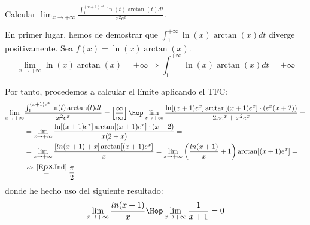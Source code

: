 \begin{ejercicio}
    Calcular $\displaystyle \lim_{x\to +\infty} \frac{\int_1^{(x+1)e^x}\ln (t) \arctan (t) dt}{x^2e^x}$.

    En primer lugar, hemos de demostrar que $\int_1^{+\infty}\ln (x) \arctan (x) dt$ diverge positivamente. Sea $f(x)=\ln (x) \arctan (x)$.
    \begin{equation*}
        \lim_{x\to +\infty} \ln (x) \arctan (x) = +\infty \Longrightarrow \int_1^{+\infty}\ln (x) \arctan (x) dt = +\infty
    \end{equation*}
    
    
    Por tanto, procedemos a calcular el límite aplicando el TFC:
     \begin{equation*}
         \begin{split}
             \lim_{x\to +\infty}& \frac{\int_1^{(x+1)e^x}\ln (t) \arctan (t) dt}{x^2e^x} =\left[\frac{\infty}{\infty}\right]
             \Hop \lim_{x\to +\infty} \frac{\ln[(x+1)e^x] \arctan [(x+1)e^x] \cdot (e^x(x+2))}{2xe^x +x^2e^x} =
             \\&= \lim_{x\to +\infty} \frac{\ln[(x+1)e^x] \arctan [(x+1)e^x] \cdot (x+2)}{x(2+x)} =
             \\&= \lim_{x\to +\infty} \frac{[ln(x+1) +x] \arctan [(x+1)e^x]}{x}
             = \lim_{x\to +\infty} \left(\frac{ln(x+1)}{x} +1\right) \arctan [(x+1)e^x] =\\&\stackrel{Ec.\;\ref{Ej28.Ind}}{=} \frac{\pi}{2}
         \end{split}
     \end{equation*}
     donde he hecho uso del siguiente resultado:
     \begin{equation}\label{Ej28.Ind}
         \lim_{x\to +\infty} \frac{ln(x+1)}{x}
         \Hop \lim_{x\to +\infty} \frac{1}{x+1} = 0
     \end{equation}
\end{ejercicio}

